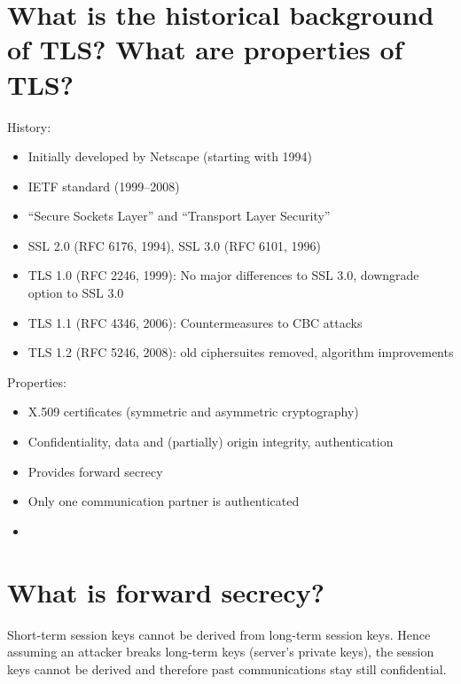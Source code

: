 \documentclass[twocolumn]{article}
\newcommand{\question}[1]{\section{#1}}
\begin{document}
\question{What is the historical background of TLS? What are properties of TLS?}
%
History:
%
\begin{itemize}
  \item Initially developed by Netscape (starting with 1994)
  \item IETF standard (1999--2008)
  \item ``Secure Sockets Layer'' and ``Transport Layer Security''
  \item SSL 2.0 (RFC 6176, 1994), SSL 3.0 (RFC 6101, 1996)
  \item TLS 1.0 (RFC 2246, 1999): No major differences to SSL 3.0, downgrade option to SSL 3.0
  \item TLS 1.1 (RFC 4346, 2006): Countermeasures to CBC attacks
  \item TLS 1.2 (RFC 5246, 2008): old ciphersuites removed, algorithm improvements
\end{itemize}

Properties:
%
\begin{itemize}
  \item X.509 certificates (symmetric and asymmetric cryptography)
  \item Confidentiality, data and (partially) origin integrity, authentication
  \item Provides forward secrecy
  \item Only one communication partner is authenticated
  \item 
\end{itemize}

\question{What is forward secrecy?}
%
Short-term session keys cannot be derived from long-term session keys.
Hence assuming an attacker breaks long-term keys (server's private keys), the session keys cannot be derived and therefore past communications stay still confidential.
\end{document}
